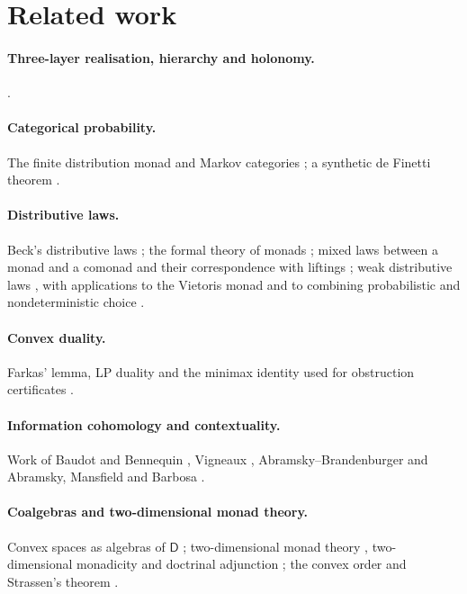 \documentclass[11pt]{article}
\theoremstyle{definition}
\theoremstyle{remark}
\newcommand{\D}{\mathsf{D}}
\begin{document}
\section{Related work}

\paragraph{Three-layer realisation, hierarchy and holonomy.}
\cite{Awasthi-ThreeLayers,Awasthi-Hierarchy,Awasthi-Holonomy}.
\paragraph{Categorical probability.} The finite distribution monad and Markov categories
\cite{Fritz2020,FGPR2023}; a synthetic de Finetti theorem \cite{FGP2021}.
\paragraph{Distributive laws.} Beck's distributive laws \cite{Beck1969}; the formal theory of monads
\cite{Street1972}; mixed laws between a monad and a comonad and their correspondence with liftings
\cite{PowerWatanabe2002}; weak distributive
laws \cite{Street2009,Bohm2010,BohmLackStreet2011}, with applications to the Vietoris monad
\cite{Garner2020} and to combining probabilistic and nondeterministic choice \cite{GoyPetrisan2020}.
\paragraph{Convex duality.} Farkas' lemma, LP duality and the minimax identity used for
obstruction certificates \cite{Schrijver1986}.
\paragraph{Information cohomology and contextuality.} Work of Baudot and Bennequin \cite{BaudotBennequin2015},
Vigneaux \cite{Vigneaux2019}, Abramsky--Brandenburger \cite{AbramskyBrandenburger2011} and
Abramsky, Mansfield and Barbosa \cite{AbramskyMansfieldBarbosa2012}.
\paragraph{Coalgebras and two-dimensional monad theory.} Convex spaces as algebras of $\D$
\cite{Fritz2009}; two-dimensional monad theory \cite{BKP1989,Lack2002}, two-dimensional monadicity
\cite{Bourke2014} and doctrinal adjunction \cite{Kelly1974}; the convex order and Strassen's theorem
\cite{Strassen1965}.
\end{document}
